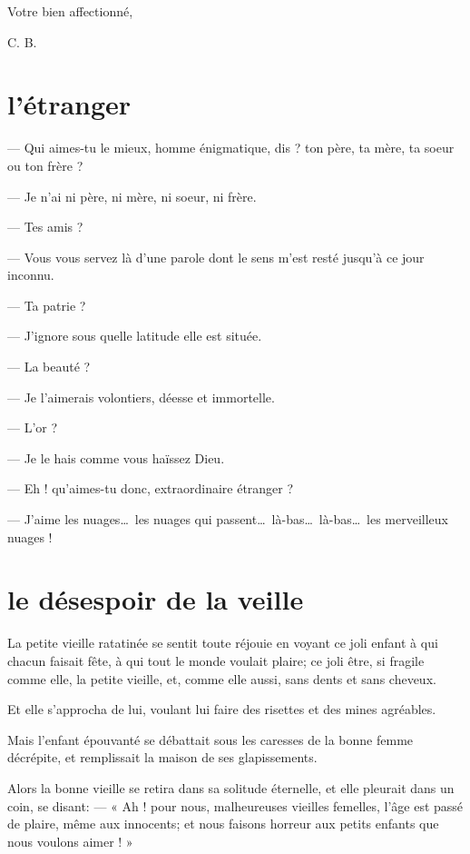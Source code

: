 \begin{flushright}
Votre bien affectionné, 

C. B.
\end{flushright}


\setcounter{secnumdepth}{2} %

\quebra\section[L’étranger]{l’étranger}

--- Qui aimes{}-tu le mieux, homme énigmatique, dis ? ton père, ta mère,
ta soeur ou ton frère ?

--- Je n’ai ni père, ni mère, ni soeur, ni frère.

--- Tes amis ?

--- Vous vous servez là d’une parole dont le sens
m’est resté jusqu’à ce jour inconnu.

--- Ta patrie ?

--- J’ignore sous quelle latitude elle est située.

--- La beauté ?

--- Je l’aimerais volontiers, déesse et immortelle.

--- L’or ?

--- Je le hais comme vous haïssez Dieu.

--- Eh ! qu’aimes{}-tu donc, extraordinaire étranger ?

--- J’aime les nuages\ldots\ les nuages qui passent\ldots\ 
là{}-bas\ldots\ là{}-bas\ldots\ les merveilleux nuages !

\quebra\section[Le désespoir de la veille]{le désespoir de la veille}

La petite vieille ratatinée se sentit toute réjouie en voyant ce joli
enfant à qui chacun faisait fête, à qui tout le monde voulait plaire;
ce joli être, si fragile comme elle, la petite vieille, et, comme elle
aussi, sans dents et sans cheveux.

Et elle s’approcha de lui, voulant lui faire des
risettes et des mines agréables.

Mais l’enfant épouvanté se débattait sous les caresses
de la bonne femme décrépite, et remplissait la maison de ses
glapissements.

Alors la bonne vieille se retira dans sa solitude éternelle, et elle
pleurait dans un coin, se disant: --- « Ah ! pour nous, malheureuses
vieilles femelles, l’âge est passé de plaire, même aux
innocents; et nous faisons horreur aux petits enfants que nous voulons
aimer ! »


